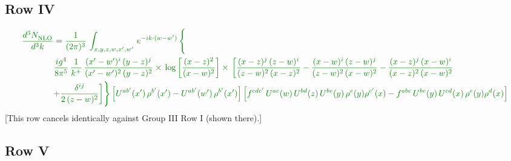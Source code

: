 \documentclass[9pt]{article}
\numberwithin{equation}{section}
\begin{document}
\subsection{Row IV}
\begin{align}
    {\color{green!50!black}\frac{d^{3}N_{\rm NLO}^{\rm}}{d^{3}k}}  & = {\color{green!50!black}\frac{1}{(2\pi)^{3}}\,
    \int_{x,y,z,w,x',w'}\,e^{-ik\cdot (w-w^\prime)}\,\Bigg\{}\notag \\
& {\color{green!50!black}\frac{ig^{4}}{8\pi^{5}}\,\frac{1}{k^{+}}\,\frac{(x'-w')^{i}\,(y-z)^{j}}{(x'-w')^{2}\,(y-z)^{2}}\times\,\log{\left[\frac{(x-z)^{2}}{(x-w)^{2}}\right]}\times\, \bigg[\frac{(x-z)^{j}\,(z-w)^{i}}{(z-w)^{2}\,(x-z)^{2}} -\frac{(x-w)^{i}\,(z-w)^{j}}{(z-w)^{2}\,(x-w)^{2}}-\frac{(x-z)^{j}\,(x-w)^{i}}{(x-z)^{2}\,(x-w)^{2}}}\notag \\ & {\color{green!50!black}+\frac{\delta^{ij}}{2\,(z-w)^{2}}\bigg]\Bigg\} \left[U^{ab'}(x')\,\rho^{b'}(x')-U^{ab'}(w')\,\rho^{b'}(x')\right] \left[f^{cdc'}\,U^{ac}(w)\,U^{bd}(z)\,U^{be}(y)\,\rho^{e}(y)\rho^{c'}(x)-f^{abc}\,U^{be}(y)\,U^{cd}(x)\,\rho^{e}(y)\rho^{d}(x)\right]}
\end{align}
{\color{green!50!black}[This row cancels identically against Group III Row I (shown there).]}
\par\noindent
\subsection{Row V}
\end{document}
